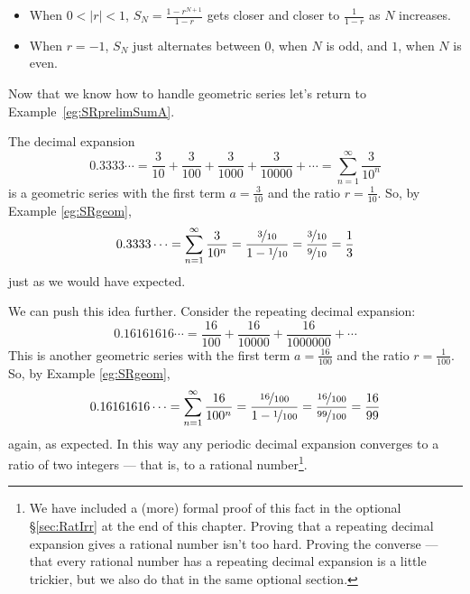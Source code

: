 \begin{eg}
\begin{itemize}
\item
When $0< |r|<1$, $S_N=\frac{1-r^{N+1}}{1-r}$ gets closer and closer to $\frac{1}{1-r}$ as $N$ increases.

\item
When $r=-1$, $S_N$ just alternates between $0$, when $N$ is odd, and $1$,
when $N$ is even.
\end{itemize}
\end{eg}
\goodbreak

Now that we know how to handle geometric series let's return to Example~\ref{eg:SRprelimSumA}.
\begin{eg}\label{eg:SRgeomB}
The decimal expansion
\begin{equation*}
0.3333\cdots
=\frac{3}{10}+\frac{3}{100}+\frac{3}{1000}+\frac{3}{10000}+\cdots
=\sum_{n=1}^\infty\frac{3}{10^n}
\end{equation*}
is a geometric series with the first term $a=\frac{3}{10}$ and the ratio
$r=\frac{1}{10}$. So, by Example \ref{eg:SRgeom},
\begin{equation*}
0.3333\cdots
=\sum_{n=1}^\infty\frac{3}{10^n}
=\frac{\nicefrac{3}{10}}{1-\nicefrac{1}{10}}
=\frac{\nicefrac{3}{10}}{\nicefrac{9}{10}}
=\frac{1}{3}
\end{equation*}
just as we would have expected.

We can push this idea further. Consider the repeating decimal expansion:
\begin{equation*}
0.16161616\cdots
=\frac{16}{100}+\frac{16}{10000}+\frac{16}{1000000}+\cdots
\end{equation*}
This is another geometric series with the first term $a=\frac{16}{100}$
and the ratio $r=\frac{1}{100}$. So, by Example \ref{eg:SRgeom},
\begin{equation*}
0.16161616\cdots
=\sum_{n=1}^\infty\frac{16}{100^n}
=\frac{\nicefrac{16}{100}}{1-\nicefrac{1}{100}}
=\frac{\nicefrac{16}{100}}{\nicefrac{99}{100}}
=\frac{16}{99}
\end{equation*}
again, as expected. In this way any periodic decimal expansion converges
to a ratio of two integers --- that is, to a rational number\footnote{We
have included a (more) formal proof of this fact in the optional
\S \ref{sec:RatIrr}
at the end of this chapter. Proving that a repeating decimal expansion
gives a rational number isn't too hard. Proving the converse --- that
every rational number has a repeating decimal expansion is a
little trickier, but we also do that in the same optional section.}.


\end{eg}
